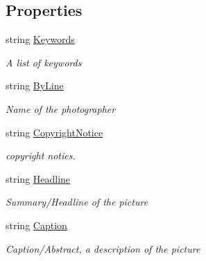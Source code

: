 \subsection*{Properties}
\begin{DoxyCompactItemize}
\item 
string \mbox{\hyperlink{class_pic_d_b_1_1_view_models_1_1_i_p_t_c_view_model_a0358809f08dae5ca402fbd91f62eeef5}{Keywords}}
\begin{DoxyCompactList}\small\item\em A list of keywords \end{DoxyCompactList}\item 
string \mbox{\hyperlink{class_pic_d_b_1_1_view_models_1_1_i_p_t_c_view_model_adeef9f73b094c9d6b313ad61585c7ea6}{By\+Line}}
\begin{DoxyCompactList}\small\item\em Name of the photographer \end{DoxyCompactList}\item 
string \mbox{\hyperlink{class_pic_d_b_1_1_view_models_1_1_i_p_t_c_view_model_a08983c5e75d28ba6730d7cf46abb2c18}{Copyright\+Notice}}
\begin{DoxyCompactList}\small\item\em copyright noties. \end{DoxyCompactList}\item 
string \mbox{\hyperlink{class_pic_d_b_1_1_view_models_1_1_i_p_t_c_view_model_aac14ee1d79fb32cfe75980c6e179c079}{Headline}}
\begin{DoxyCompactList}\small\item\em Summary/\+Headline of the picture \end{DoxyCompactList}\item 
string \mbox{\hyperlink{class_pic_d_b_1_1_view_models_1_1_i_p_t_c_view_model_a8aaa4a445411478497dcfc0128172a60}{Caption}}
\begin{DoxyCompactList}\small\item\em Caption/\+Abstract, a description of the picture \end{DoxyCompactList}\end{DoxyCompactItemize}


